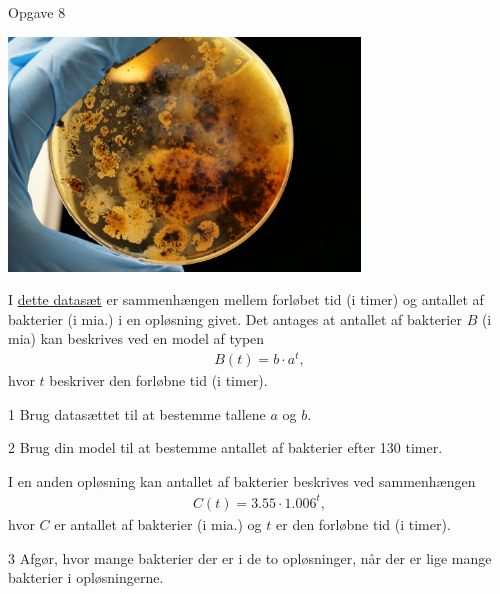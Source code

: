 
\begin{opgavetekst}{Opgave 8}
	\begin{center}
		\includegraphics[width=0.7\textwidth]{Billeder/Bakterie.jpg}
	\end{center}
	I \href{https://github.com/ChristianJLex/TeachingNotes/raw/master/2022-2023/Data%20og%20lign/BakterierAfl5.xlsx}{\color{blue!60} dette datasæt} er sammenhængen mellem forløbet tid (i timer) og antallet af 	
	   bakterier (i mia.) i en opløsning givet. Det antages at antallet af bakterier $B$ (i mia) kan beskrives ved en 
	model af typen
	\begin{align*}
		B(t) = b\cdot a^t,
	\end{align*}
	hvor $t$ beskriver den forløbne tid (i timer).
\end{opgavetekst}

\begin{delopgave}{}{1}
	Brug datasættet til at bestemme tallene $a$ og $b$.
\end{delopgave}

\begin{delopgave}{}{2}
	Brug din model til at bestemme antallet af bakterier efter 130 timer. 
\end{delopgave}

\begin{meretekst}
	I en anden opløsning kan antallet af bakterier beskrives ved sammenhængen 
	\begin{align*}
		C(t) = 3.55 \cdot 1.006^t,
	\end{align*}
	hvor $C$ er antallet af bakterier (i mia.) og $t$ er den forløbne tid (i timer).
\end{meretekst}

\begin{delopgave}{}{3}
	Afgør, hvor mange bakterier der er i de to opløsninger, når der er lige mange bakterier i opløsningerne. 
\end{delopgave}


